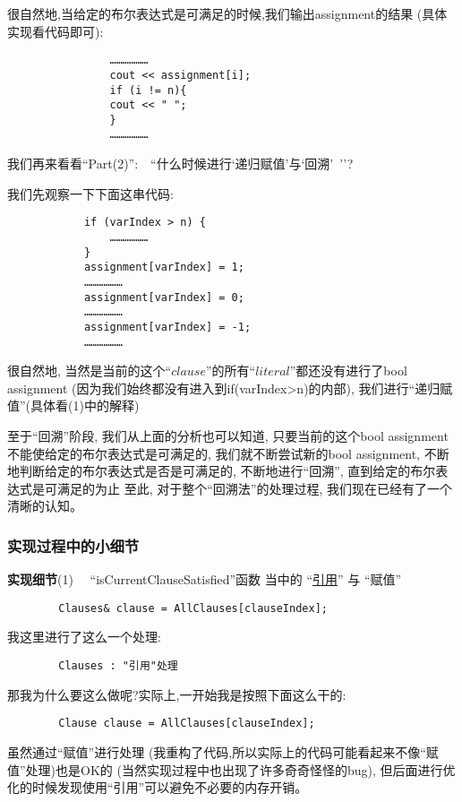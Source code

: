         \par
        很自然地,当给定的布尔表达式是可满足的时候,我们输出assignment的结果
        (具体实现看代码即可):
        \begin{lstlisting}
                ………………
                cout << assignment[i];
                if (i != n){
                cout << " ";  
                } 
                ………………
        \end{lstlisting}
        \par
        我们再来看看``Part(2)'':$\quad$``什么时候进行`递归赋值'与`回溯'\ ''?
        \par
        我们先观察一下下面这串代码:
        \begin{lstlisting}
            if (varIndex > n) {
                ………………
            }
            assignment[varIndex] = 1;
            ………………
            assignment[varIndex] = 0;
            ………………
            assignment[varIndex] = -1;
            ………………
        \end{lstlisting}
        \par
        很自然地,
        当然是当前的这个``$clause$''的所有``$literal$''都还没有进行了bool assignment
        (因为我们始终都没有进入到if(varIndex>n)的内部),
        我们进行``递归赋值''(具体看(1)中的解释)
        \par
        至于``回溯''阶段,
        我们从上面的分析也可以知道,
        只要当前的这个bool assignment不能使给定的布尔表达式是可满足的,
        我们就不断尝试新的bool assignment,
        不断地判断给定的布尔表达式是否是可满足的,
        不断地进行``回溯'',
        直到给定的布尔表达式是可满足的为止
        至此,
        对于整个``回溯法''的处理过程,
        我们现在已经有了一个清晰的认知。
        \subsubsection{实现过程中的小细节}
        \noindent
        \textbf{实现细节}(1)$\quad$
        ``isCurrentClauseSatisfied''函数
        当中的
        ``\underline{引用}''
        与
        ``赋值''
        \begin{lstlisting}
        Clauses& clause = AllClauses[clauseIndex];
        \end{lstlisting}
        \par
        我这里进行了这么一个处理:
        \begin{lstlisting}
        Clauses : "引用"处理
        \end{lstlisting}
        \par
        那我为什么要这么做呢?实际上,一开始我是按照下面这么干的:
        \begin{lstlisting}
        Clause clause = AllClauses[clauseIndex];
        \end{lstlisting}
        \par
        虽然通过``赋值''进行处理
        (我重构了代码,所以实际上的代码可能看起来不像``赋值''处理)也是OK的
        (当然实现过程中也出现了许多奇奇怪怪的bug),
        但后面进行优化的时候发现使用``引用''可以避免不必要的内存开销。
